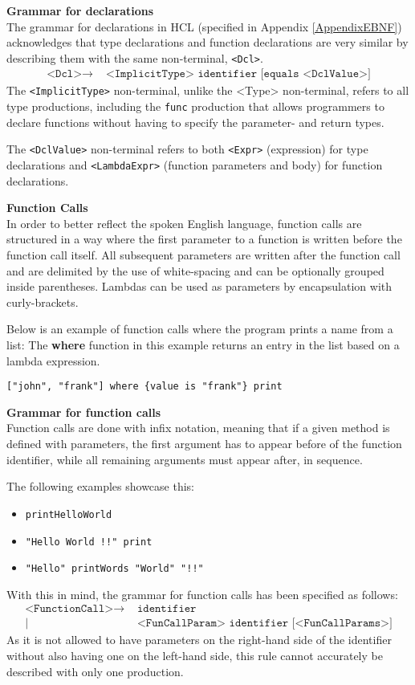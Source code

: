 \textbf{Grammar for declarations}\\
The grammar for declarations in HCL (specified in Appendix \ref{AppendixEBNF}) acknowledges that type declarations and function declarations are very similar by describing them with the same non-terminal, \texttt{<Dcl>}.
\begin{align*}
	\texttt{<Dcl>}\to & \texttt{ <ImplicitType> identifier [equals <DclValue>]}
\end{align*}
The \texttt{<ImplicitType>} non-terminal, unlike the <Type> non-terminal, refers to all type productions, including the \texttt{func} production that allows programmers to declare functions without having to specify the parameter- and return types.

The \texttt{<DclValue>} non-terminal refers to both \texttt{<Expr>} (expression) for type declarations and \texttt{<LambdaExpr>} (function parameters and body) for function declarations.

\textbf{Function Calls}\\
In order to better reflect the spoken English language, function calls are structured in a way where the first parameter to a function is written before the function call itself.
All subsequent parameters are written after the function call and are delimited by the use of white-spacing and can be optionally grouped inside parentheses.
Lambdas can be used as parameters by encapsulation with curly-brackets. 

Below is an example of function calls where the program prints a name from a list:
The \textbf{where} function in this example returns an entry in the list based on a lambda expression.
\begin{lstlisting}
["john", "frank"] where {value is "frank"} print
\end{lstlisting}

\textbf{Grammar for function calls}\\
Function calls are done with infix notation, meaning that if a given method is defined with parameters, the first argument has to appear before of the function identifier, while all remaining arguments must appear after, in sequence.

The following examples showcase this:
\begin{itemize}
	\item \texttt{printHelloWorld}
	\item \texttt{"Hello World !!" print}
	\item \texttt{"Hello" printWords "World" "!!"}
\end{itemize}
With this in mind, the grammar for function calls has been specified as follows:
\begin{align*}
	\texttt{<FunctionCall>}\to & \texttt{ identifier}\\
	| & \texttt{ <FunCallParam> identifier [<FunCallParams>]}
\end{align*}
As it is not allowed to have parameters on the right-hand side of the identifier without also having one on the left-hand side, this rule cannot accurately be described with only one production.

